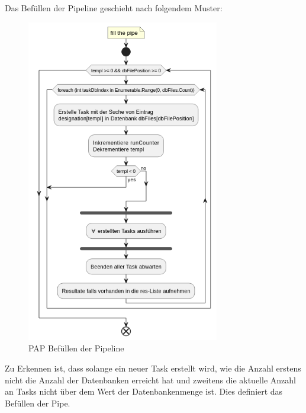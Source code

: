    \newpage
    Das Befüllen der Pipeline geschieht nach folgendem Muster:
    \begin{figure}[H]
        \centering
        \includegraphics[width=0.75\textwidth]{../pap/Case_A_k.png}
        \caption{\ac{PAP} Befüllen der Pipeline}
        \label{png:case_a}
    \end{figure}
    \noindent Zu Erkennen ist, dass solange ein neuer Task erstellt wird, wie die Anzahl erstens nicht die Anzahl der Datenbanken erreicht hat und zweitens die aktuelle Anzahl an Tasks nicht über dem Wert der Datenbankenmenge ist.
    Dies definiert das Befüllen der Pipe.

